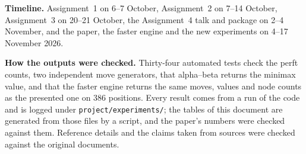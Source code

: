 \documentclass[a4paper,10pt]{article}
\begin{document}
\textbf{Timeline.} Assignment~1 on 6--7 October, Assignment~2 on 7--14 October, Assignment~3 on 20--21 October, the
Assignment~4 talk and package on 2--4 November, and the paper, the faster engine and the new experiments on
4--17 November 2026.

\textbf{How the outputs were checked.} Thirty-four automated tests check the perft counts, two independent move
generators, that alpha--beta returns the minimax value, and that the faster engine returns the same moves, values and
node counts as the presented one on 386 positions. Every result comes from a run of the code and is logged under
\texttt{project/experiments/}; the tables of this document are generated from those files by a script, and the
paper's numbers were checked against them. Reference details and the claims taken from sources were checked against
the original documents.
\end{document}

